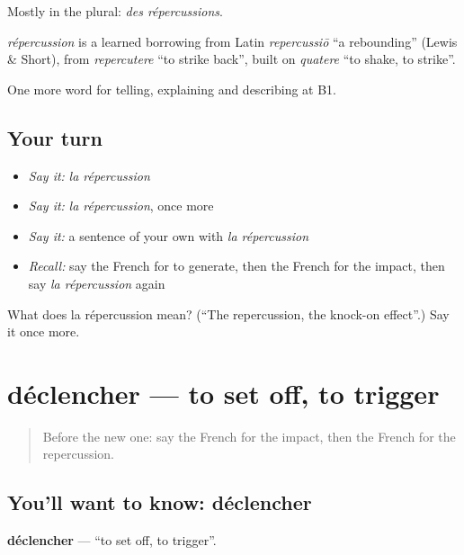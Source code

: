 Mostly in the plural: \emph{des répercussions}.

\begin{cousinweb}
\emph{répercussion} is a learned borrowing from Latin \emph{repercussiō} \textquotedblleft{}a rebounding\textquotedblright{} (Lewis \& Short), from \emph{repercutere} \textquotedblleft{}to strike back\textquotedblright{}, built on \emph{quatere} \textquotedblleft{}to shake, to strike\textquotedblright{}.
\end{cousinweb}

\begin{grammarlens}[title={What you've built}]
One more word for telling, explaining and describing at B1.
\end{grammarlens}

\subsection*{Your turn}
\begin{itemize}
\raggedright
  \item \emph{Say it:} \emph{la répercussion}
  \item \emph{Say it:} \emph{la répercussion}, once more
  \item \emph{Say it:} a sentence of your own with \emph{la répercussion}
  \item \emph{Recall:} say the French for to generate, then the French for the impact, then say \emph{la répercussion} again
\end{itemize}

\begin{tcolorbox}[breakable,colback=teal!4,colframe=teal!35!black,title={Before you move on}]
What does la répercussion mean? (\textquotedblleft{}The repercussion, the knock-on effect\textquotedblright{}.) Say it once more.
\end{tcolorbox}
\section[déclencher]{déclencher — to set off, to trigger}

\label{lesson:FR-C350-declencher}



\begin{quote}
Before the new one: say the French for the impact, then the French for the repercussion.
\end{quote}

\subsection*{You'll want to know: déclencher}
\textbf{déclencher} — \textquotedblleft{}to set off, to trigger\textquotedblright{}.

